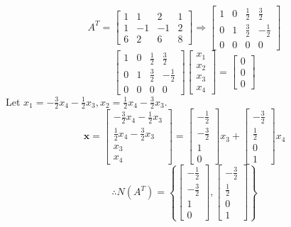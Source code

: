 $$A^T=\begin{bmatrix}
    1&1&2&1\\1&-1&-1&2\\6&2&6&8
\end{bmatrix}\Rightarrow\begin{bmatrix}
    1&0&\frac{1}{2}&\frac{3}{2}\\
    0&1&\frac{3}{2}&-\frac{1}{2}\\
    0&0&0&0
\end{bmatrix}$$
$$\begin{bmatrix}
1&0&\frac{1}{2}&\frac{3}{2}\\
0&1&\frac{3}{2}&-\frac{1}{2}\\
0&0&0&0
\end{bmatrix}\begin{bmatrix}
    x_1\\x_2\\x_3\\x_4
\end{bmatrix}=\begin{bmatrix}
    0\\0\\0
\end{bmatrix}$$
Let $x_1=-\frac{3}{2}x_4-\frac{1}{2}x_3, x_2=\frac{1}{2}x_4-\frac{3}{2}x_3$.
$$\mathbf{x}=\begin{bmatrix}
    -\frac{3}{2}x_4-\frac{1}{2}x_3\\
    \frac{1}{2}x_4-\frac{3}{2}x_3\\
    x_3\\
    x_4
\end{bmatrix}=\begin{bmatrix}
    -\frac{1}{2}\\
    -\frac{3}{2}\\
    1\\
    0
\end{bmatrix}x_3+\begin{bmatrix}
    -\frac{3}{2}\\
    \frac{1}{2}\\
    0\\
    1
\end{bmatrix}x_4$$
$$\therefore N(A^T)=\left\{\begin{bmatrix}
    -\frac{1}{2}\\
    -\frac{3}{2}\\
    1\\
    0
\end{bmatrix},\begin{bmatrix}
    -\frac{3}{2}\\
    \frac{1}{2}\\
    0\\
    1
\end{bmatrix}\right\}$$\\

